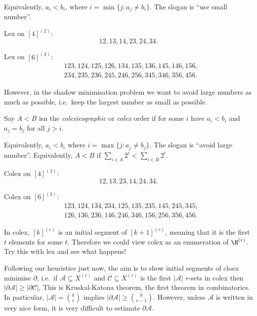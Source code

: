 \documentclass[a4paper]{article}
\newcommand{\shadow}{\partial}
\begin{document}
Equivalently, \(a_i < b_i\), where \(i = \min\{j: a_j \neq b_i\}\). The slogan is ``use small number''.

\begin{eg}
  Lex on \([4]^{(2)}\):
  \[
    12, 13, 14, 23, 24, 34.
  \]

  Lex on \([6]^{(3)}\):
  \begin{align*}
    &123, 124, 125, 126, 134, 135, 136, 145, 146, 156, \\
    &234, 235, 236, 245, 246, 256, 345, 346, 356, 456.
  \end{align*}
\end{eg}

However, in the shadow minimisation problem we want to avoid large numbers as much as possible, i.e.\ keep the largest number as small as possible.

\begin{definition}
  Say \(A < B\) isn the \emph{colexicographic} or \emph{colex} order if for some \(i\) have \(a_i < b_i\) and \(a_j = b_j\) for all \(j > i\).
\end{definition}

Equivalently, \(a_i < b_i\) where \(i = \max\{j: a_j \neq b_j\}\). The slogan is ``avoid large number''. Equivalently, \(A < B\) if \(\sum_{i \in A} 2^i < \sum_{i \in B} 2^i\).

\begin{eg}
  Colex on \([4]^{(2)}\):
  \[
    12, 13, 23, 14, 24, 34.
  \]

  Colex on \([6]^{(2)}\):
  \begin{align*}
    &123, 124, 134, 234, 125, 135, 235, 145, 245, 345,\\
    &126, 136, 236, 146, 246, 346, 156, 256, 356, 456.
  \end{align*}
\end{eg}

\begin{note}
  In colex, \([k]^{(r)}\) is an initial segment of \([k + 1]^{(r)}\), meaning that it is the first \(t\) elements for some \(t\). Therefore we could view colex as an enumeration of \(\N^{(r)}\). Try this with lex and see what happens!
\end{note}

Following our heuristics just now, the aim is to show initial segments of cloex minimise \(\shadow\), i.e.\ if \(\mathcal A \subseteq X^{(r)}\) and \(\mathcal C \subseteq X^{(r)}\) is the first \(|\mathcal A|\) \(r\)-sets in colex then \(|\shadow \mathcal A| \geq |\shadow \mathcal C|\), This is Kruskal-Katona theorem, the first theorem in combinatorics.
In particular, \(|\mathcal A| = \binom{k}{r}\) implies \(|\shadow \mathcal A| \geq \binom{k}{r - 1}\). However, unless \(\mathcal A\) is written in very nice form, it is very difficult to estimate \(\shadow \mathcal A\).
\end{document}
